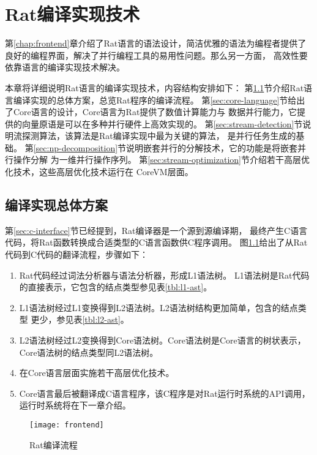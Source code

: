 \chapter{Rat编译实现技术}\label{chap:compiler}
第\ref{chap:frontend}章介绍了Rat语言的语法设计，简洁优雅的语法为编程者提供了
良好的编程界面，解决了并行编程工具的易用性问题。那么另一方面，
高效性要依靠语言的编译实现技术解决。

本章将详细说明Rat语言的编译实现技术，内容结构安排如下：
第\ref{sec:compiler-overview}节介绍Rat语言编译实现的总体方案，总览Rat程序的编译流程。
第\ref{sec:core-language}节给出了Core语言的设计，Core语言为Rat提供了数值计算能力与
数据并行能力，它提供的向量原语是可以在多种并行硬件上高效实现的。
第\ref{sec:stream-detection}节说明流探测算法，该算法是Rat编译实现中最为关键的算法，
是并行任务生成的基础。
第\ref{sec:np-decomposition}节说明嵌套并行的分解技术，它的功能是将嵌套并行操作分解
为一维并行操作序列。
第\ref{sec:stream-optimization}节介绍若干高层优化技术，这些高层优化技术运行在
CoreVM层面。

\section{编译实现总体方案}\label{sec:compiler-overview}
第\ref{sec:c-interface}节已经提到，Rat编译器是一个源到源编译期，
最终产生C语言代码，将Rat函数转换成合适类型的C语言函数供C程序调用。
图\ref{fig:frontend}给出了从Rat代码到C代码的翻译流程，步骤如下：
\begin{enumerate}
  \item Rat代码经过词法分析器与语法分析器，形成L1语法树。
    L1语法树是Rat代码的直接表示，它包含的结点类型参见表\ref{tbl:l1-ast}。
  \item L1语法树经过L1变换得到L2语法树。L2语法树结构更加简单，包含的结点类型
    更少，参见表\ref{tbl:l2-ast}。
  \item L2语法树经过L2变换得到Core语法树。Core语法树是Core语言的树状表示，
    Core语法树的结点类型同L2语法树。
  \item 在Core语言层面实施若干高层优化技术。
  \item Core语言最后被翻译成C语言程序，该C程序是对Rat运行时系统的API调用，
    运行时系统将在下一章介绍。
\end{enumerate}
\begin{figure}[tbh]
  \centering
  \texttt{[image: frontend]}
  \caption{Rat编译流程}
  \label{fig:frontend}
\end{figure}

